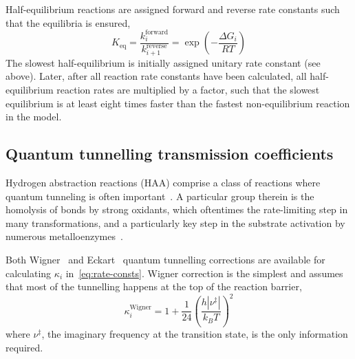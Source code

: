Half-equilibrium reactions are assigned forward and reverse rate constants such that the equilibria is ensured,
% 
\begin{equation}
	K_\text{eq}
	= \frac{k_i^\text{forward}}{k_{i + 1}^\text{reverse}}
	= \exp \left(-\frac{\Delta G_i}{R T} \right)
\end{equation}
% 
The slowest half-equilibrium is initially assigned unitary rate constant (see above).
Later,
after all reaction rate constants have been calculated,
all half-equilibrium reaction rates are multiplied by a factor,
such that the slowest equilibrium is at least eight times faster than the fastest non-equilibrium reaction in the model.

\subsection{Quantum tunnelling transmission coefficients}

Hydrogen abstraction reactions (HAA) comprise a class of reactions where
quantum tunneling is often important~\cite{Bim2018}.
A particular group therein is the homolysis of  bonds by strong
oxidants,
which oftentimes the rate-limiting step in many transformations,
and
a particularly key step in the substrate activation by numerous
metalloenzymes~\cite{Bim2018}.

Both Wigner~\cite{Wigner_1932} and Eckart~\cite{Eckart_1930} quantum tunnelling corrections are available for calculating $\kappa_i$ in~\cref{eq:rate-consts}.
Wigner correction is the simplest and assumes that most of the tunnelling happens at the top of the reaction barrier,
% 
\begin{equation}
	\kappa_i^\text{Wigner}
	= 1 + \frac{1}{24}
	\left(
	\frac{
		h | \nu^\ddagger |
	}{k_B T}
	\right)^2
\end{equation}
% 
where $\nu^\ddagger$,
the imaginary frequency at the transition state,
is the only information required.

